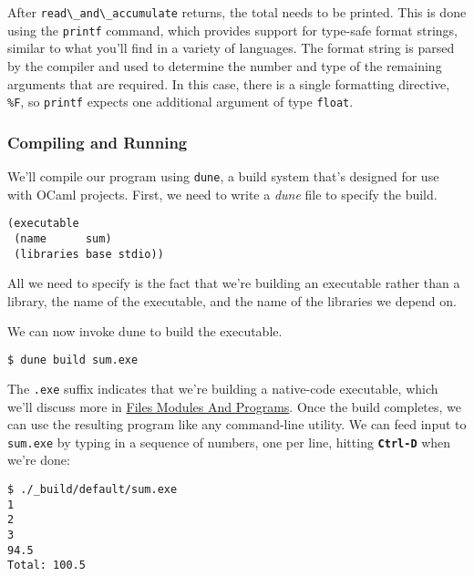 After \passthrough{\lstinline!read\_and\_accumulate!} returns, the total
needs to be printed. This is done using the
\passthrough{\lstinline!printf!} command, which provides support for
type-safe format strings, similar to what you'll find in a variety of
languages. The format string is parsed by the compiler and used to
determine the number and type of the remaining arguments that are
{required}. In this case, there is a single formatting directive,
\passthrough{\lstinline!\%F!}, so \passthrough{\lstinline!printf!}
expects one additional argument of type \passthrough{\lstinline!float!}.

\hypertarget{compiling-and-running}{%
\subsubsection{Compiling and Running}\label{compiling-and-running}}

We'll compile our program using \passthrough{\lstinline!dune!}, a build
system that's designed for use with OCaml projects. First, we need to
write a \emph{dune} file to specify the build.

\begin{lstlisting}
(executable
 (name      sum)
 (libraries base stdio))
\end{lstlisting}

All we need to specify is the fact that we're building an executable
rather than a library, the name of the executable, and the name of the
libraries we depend on.

We can now invoke dune to build the executable.

\begin{lstlisting}[language=bash]
$ dune build sum.exe
\end{lstlisting}

The \passthrough{\lstinline!.exe!} suffix indicates that we're building
a native-code executable, which we'll discuss more in
\href{files-modules-and-programs.html\#files-modules-and-programs}{Files
Modules And Programs}. Once the build completes, we can use the
resulting program like any command-line utility. We can feed input to
\passthrough{\lstinline!sum.exe!} by typing in a sequence of numbers,
one per line, hitting \textbf{\passthrough{\lstinline!Ctrl-D!}} when
we're done:

\begin{lstlisting}
$ ./_build/default/sum.exe
1
2
3
94.5
Total: 100.5
\end{lstlisting}

